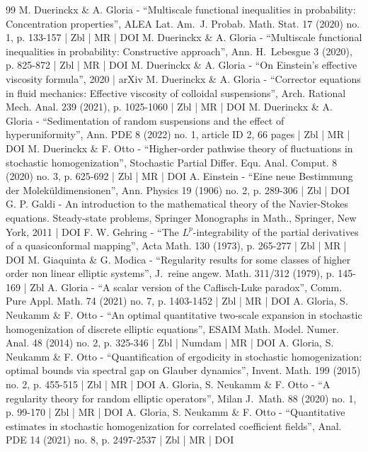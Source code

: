 \documentclass[10pt]{amsart}
\theoremstyle{plain}
\theoremstyle{definition}
\begin{document}
\begin{thebibliography}{99}
M. Duerinckx \& A. Gloria - “Multiscale functional inequalities in probability: Concentration properties”, ALEA Lat. Am. J. Probab. Math. Stat. 17 (2020) no. 1, p. 133-157 | Zbl | MR | DOI
M. Duerinckx \& A. Gloria - “Multiscale functional inequalities in probability: Constructive approach”, Ann. H. Lebesgue 3 (2020), p. 825-872 | Zbl | MR | DOI
M. Duerinckx \& A. Gloria - “On Einstein’s effective viscosity formula”, 2020 | arXiv
M. Duerinckx \& A. Gloria - “Corrector equations in fluid mechanics: Effective viscosity of colloidal suspensions”, Arch. Rational Mech. Anal. 239 (2021), p. 1025-1060 | Zbl | MR | DOI
M. Duerinckx \& A. Gloria - “Sedimentation of random suspensions and the effect of hyperuniformity”, Ann. PDE 8 (2022) no. 1, article ID 2, 66 pages | Zbl | MR | DOI
M. Duerinckx \& F. Otto - “Higher-order pathwise theory of fluctuations in stochastic homogenization”, Stochastic Partial Differ. Equ. Anal. Comput. 8 (2020) no. 3, p. 625-692 | Zbl | MR | DOI
A. Einstein - “Eine neue Bestimmung der Moleküldimensionen”, Ann. Physics 19 (1906) no. 2, p. 289-306 | Zbl | DOI
G. P. Galdi - An introduction to the mathematical theory of the Navier-Stokes equations. Steady-state problems, Springer Monographs in Math., Springer, New York, 2011 | DOI
F. W. Gehring - “The $L^p$-integrability of the partial derivatives of a quasiconformal mapping”, Acta Math. 130 (1973), p. 265-277 | Zbl | MR | DOI
M. Giaquinta \& G. Modica - “Regularity results for some classes of higher order non linear elliptic systems”, J. reine angew. Math. 311/312 (1979), p. 145-169 | Zbl
A. Gloria - “A scalar version of the Caflisch-Luke paradox”, Comm. Pure Appl. Math. 74 (2021) no. 7, p. 1403-1452 | Zbl | MR | DOI
A. Gloria, S. Neukamm \& F. Otto - “An optimal quantitative two-scale expansion in stochastic homogenization of discrete elliptic equations”, ESAIM Math. Model. Numer. Anal. 48 (2014) no. 2, p. 325-346 | Zbl | Numdam | MR | DOI
A. Gloria, S. Neukamm \& F. Otto - “Quantification of ergodicity in stochastic homogenization: optimal bounds via spectral gap on Glauber dynamics”, Invent. Math. 199 (2015) no. 2, p. 455-515 | Zbl | MR | DOI
A. Gloria, S. Neukamm \& F. Otto - “A regularity theory for random elliptic operators”, Milan J. Math. 88 (2020) no. 1, p. 99-170 | Zbl | MR | DOI
A. Gloria, S. Neukamm \& F. Otto - “Quantitative estimates in stochastic homogenization for correlated coefficient fields”, Anal. PDE 14 (2021) no. 8, p. 2497-2537 | Zbl | MR | DOI

\end{thebibliography}
\end{document}
